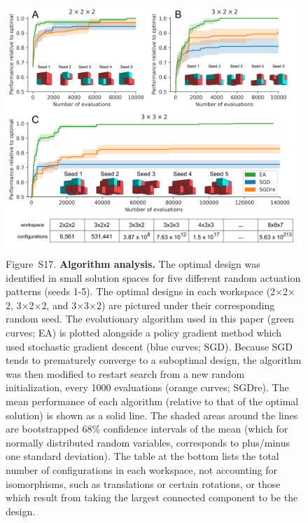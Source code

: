 \begin{figure}[t]
\centering
\includegraphics[width=\linewidth]{Chapter07/img/algo analysis.png}
\caption*{Figure~S17. \textbf{Algorithm analysis.} 
The optimal design was identified in small solution spaces for five different random actuation patterns (seeds 1-5). 
The optimal designs in each workspace (2{$\times$}2{$\times$}2, 3{$\times$}2{$\times$}2, and 3{$\times$}3{$\times$}2) are pictured under their corresponding random seed. 
The evolutionary algorithm used in this paper (green curves; EA) is plotted alongside a policy gradient method \cite{sehnke2010parameter} which used stochastic gradient descent (blue curves; SGD). 
Because SGD tends to prematurely converge to a suboptimal design, the algorithm was then modified to restart search from a new random initialization, every 1000 evaluations (orange curves; SGDre). 
The mean performance of each algorithm (relative to that of the optimal solution) is shown as a solid line. 
The shaded areas around the lines are bootstrapped 68\% confidence intervals of the mean (which for normally distributed random variables, corresponds to plus/minus one standard deviation). 
The table at the bottom lists the total number of configurations in each workspace, not accounting for isomorphisms, such as translations or certain rotations, or those which result from taking the largest connected component to be the design.
}
\end{figure}

